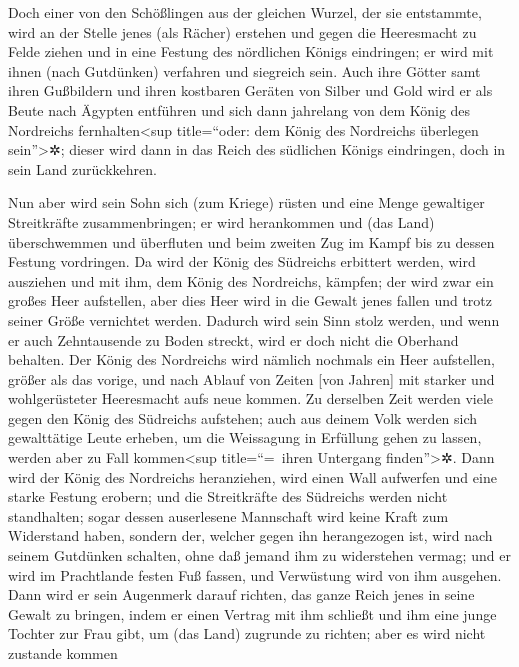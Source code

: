 Doch einer von den Schößlingen aus der gleichen Wurzel,
der sie entstammte, wird an der Stelle jenes (als Rächer) erstehen und
gegen die Heeresmacht zu Felde ziehen und in eine Festung des nördlichen
Königs eindringen; er wird mit ihnen (nach Gutdünken) verfahren und
siegreich sein. Auch ihre Götter samt ihren Gußbildern und
ihren kostbaren Geräten von Silber und Gold wird er als Beute nach
Ägypten entführen und sich dann jahrelang von dem König des Nordreichs
fernhalten\textless sup title=``oder: dem König des Nordreichs überlegen
sein''\textgreater✲; dieser wird dann in das Reich des
südlichen Königs eindringen, doch in sein Land zurückkehren.

Nun aber wird sein Sohn sich (zum Kriege) rüsten und eine
Menge gewaltiger Streitkräfte zusammenbringen; er wird herankommen und
(das Land) überschwemmen und überfluten und beim zweiten Zug im Kampf
bis zu dessen Festung vordringen. Da wird der König des
Südreichs erbittert werden, wird ausziehen und mit ihm, dem König des
Nordreichs, kämpfen; der wird zwar ein großes Heer aufstellen, aber dies
Heer wird in die Gewalt jenes fallen und trotz seiner
Größe vernichtet werden. Dadurch wird sein Sinn stolz werden, und wenn
er auch Zehntausende zu Boden streckt, wird er doch nicht die Oberhand
behalten. Der König des Nordreichs wird nämlich nochmals
ein Heer aufstellen, größer als das vorige, und nach Ablauf von Zeiten
{[}von Jahren{]} mit starker und wohlgerüsteter Heeresmacht aufs neue
kommen. Zu derselben Zeit werden viele gegen den König
des Südreichs aufstehen; auch aus deinem Volk werden sich gewalttätige
Leute erheben, um die Weissagung in Erfüllung gehen zu lassen, werden
aber zu Fall kommen\textless sup title=``=~ihren Untergang
finden''\textgreater✲. Dann wird der König des Nordreichs
heranziehen, wird einen Wall aufwerfen und eine starke Festung erobern;
und die Streitkräfte des Südreichs werden nicht standhalten; sogar
dessen auserlesene Mannschaft wird keine Kraft zum Widerstand haben,
sondern der, welcher gegen ihn herangezogen ist, wird
nach seinem Gutdünken schalten, ohne daß jemand ihm zu widerstehen
vermag; und er wird im Prachtlande festen Fuß fassen, und Verwüstung
wird von ihm ausgehen. Dann wird er sein Augenmerk darauf
richten, das ganze Reich jenes in seine Gewalt zu bringen, indem er
einen Vertrag mit ihm schließt und ihm eine junge Tochter zur Frau gibt,
um (das Land) zugrunde zu richten; aber es wird nicht zustande kommen
